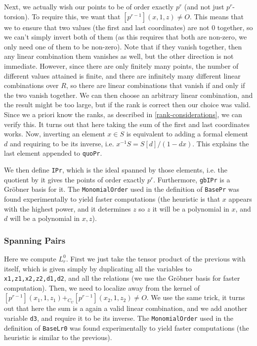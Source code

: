 Next, we actually wish our points to be of order exactly $p^r$ (and not just $p^r$-torsion).
To require this, we want that $\left[p^{r-1}\right]\left(x,1,z\right) \neq O$.
This means that we to ensure that two values (the first and last coordinates) are not $0$ together, so we can't simply invert both of them (as this requires that both are non-zero, we only need one of them to be non-zero).
Note that if they vanish together, then any linear combination them vanishes as well, but the other direction is not immediate.
However, since there are only finitely many points, the number of different values attained is finite, and there are infinitely many different linear combinations over $R$, so there are linear combinations that vanish if and only if the two vanish together.
We can then choose an arbitrary linear combination, and the result might be too large, but if the rank is correct then our choice was valid.
Since we a priori know the ranks, as described in \ref{rank-considerations}, we can verify this.
It turns out that here taking the sum of the first and last coordinates works.
Now, inverting an element $x \in S$ is equivalent to adding a formal element $d$ and requiring to be its inverse, i.e. $x^{-1} S = S\left[d\right]/(1 - dx)$.
This explains the last element appended to \texttt{quoPr}.

We then define \texttt{IPr}, which is the ideal spanned by those elements, i.e. the quotient by it gives the points of order exactly $p^r$.
Furthermore, \texttt{gbIPr} is a Gr\"{o}bner basis for it.
The \texttt{MonomialOrder} used in the definition of \texttt{BasePr} was found experimentally to yield faster computations (the heuristic is that $x$ appears with the highest power, and it determines $z$ so $z$ it will be a polynomial in $x$, and $d$ will be a polynomial in $x,z$).

\subsubsection{Spanning Pairs}

Here we compute $L_r^0$.
First we just take the tensor product of the previous with itself, which is given simply by duplicating all the variables to \texttt{x1,z1,x2,z2,d1,d2}, and all the relations (we use the Gr\"{o}bner basis for faster computation).
Then, we need to localize away from the kernel of $\left[p^{r-1}\right]\left(x_1,1,z_1\right) +_{C_U} \left[p^{r-1}\right]\left(x_2,1,z_2\right) \neq O$.
We use the same trick, it turns out that here the sum is a again a valid linear combination, and we add another variable \texttt{d3}, and require it to be its inverse.
The \texttt{MonomialOrder} used in the definition of \texttt{BaseLr0} was found experimentally to yield faster computations (the heuristic is similar to the previous).

